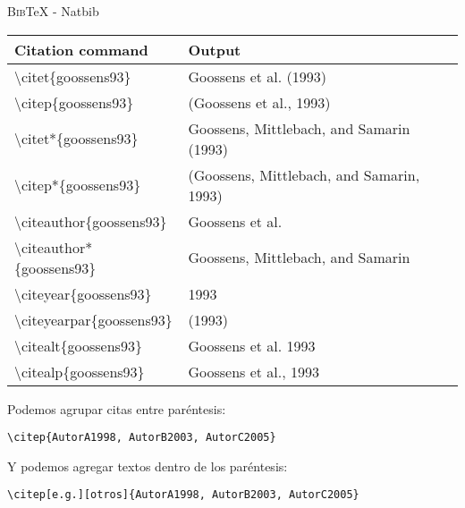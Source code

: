 \documentclass[11pt]{beamer}
\newcommand{\BibTeX}{\textsc{Bib}\TeX{}}
\begin{document}
\begin{frame}[fragile]{\BibTeX{} - Natbib}

{\footnotesize
\begin{tabular}{l | l}
\textbf{Citation command} 	& \textbf{Output} \\ \hline
\textbackslash citet\{goossens93\}       & Goossens et al. (1993)                    \\
\textbackslash citep\{goossens93\}       & (Goossens et al., 1993)                   \\ \hline
\textbackslash citet*\{goossens93\}      & Goossens, Mittlebach, and Samarin (1993)  \\
\textbackslash citep*\{goossens93\}      & (Goossens, Mittlebach, and Samarin, 1993) \\ \hline
\textbackslash citeauthor\{goossens93\}  & Goossens et al.                           \\
\textbackslash citeauthor*\{goossens93\} & Goossens, Mittlebach, and Samarin         \\ \hline
\textbackslash citeyear\{goossens93\}    & 1993                                      \\
\textbackslash citeyearpar\{goossens93\} & (1993)                                    \\ \hline
\textbackslash citealt\{goossens93\}     & Goossens et al. 1993                      \\
\textbackslash citealp\{goossens93\}     & Goossens et al., 1993                     \\
\end{tabular}
}

\vspace{1em}

{\small Podemos agrupar citas entre paréntesis:}
\vspace{-1em}

{\color{new_green} \scriptsize
\begin{verbatim}
\citep{AutorA1998, AutorB2003, AutorC2005}
\end{verbatim}
}

{\small Y podemos agregar textos dentro de los paréntesis:}
\vspace{-1em}

{\color{new_green} \scriptsize
\begin{verbatim}
\citep[e.g.][otros]{AutorA1998, AutorB2003, AutorC2005}
\end{verbatim}
}

\end{frame}
\end{document}
